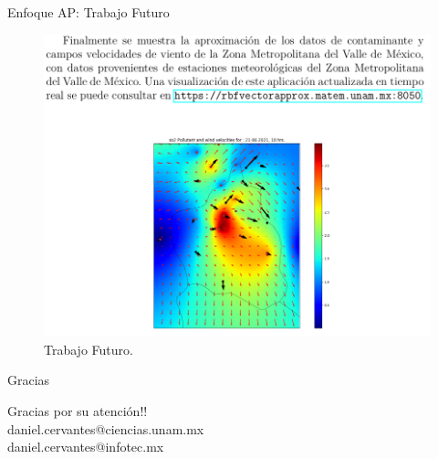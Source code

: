 \documentclass[aspectratio=1610]{beamer}
\begin{document}
\begin{frame} {Enfoque AP: Trabajo Futuro}
    \begin{figure}[h]
    \centering
    \includegraphics[scale=0.4]{fig12}
    \caption{Trabajo Futuro. }
  \end{figure}
\end{frame}



\begin{frame} {Gracias}
  \begin{center}
    Gracias por su atenci\'on!! \\
    daniel.cervantes@ciencias.unam.mx \\ 
    daniel.cervantes@infotec.mx
  \end{center}
\end{frame}
\end{document}
